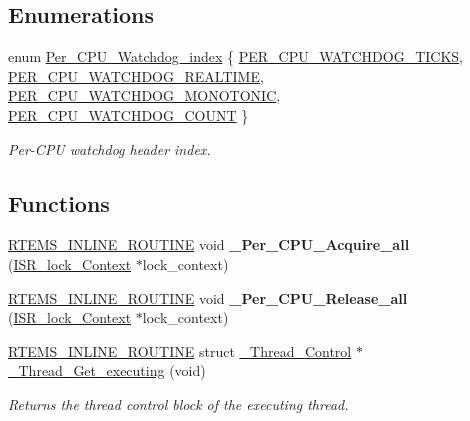 \subsection*{Enumerations}
\begin{DoxyCompactItemize}
\item 
enum \mbox{\hyperlink{group__PerCPU_ga43ab5440a69211901b58fa787f9cd76e}{Per\+\_\+\+C\+P\+U\+\_\+\+Watchdog\+\_\+index}} \{ \mbox{\hyperlink{group__PerCPU_gga43ab5440a69211901b58fa787f9cd76ea5c304d1cc31623c14e84892aec184fc0}{P\+E\+R\+\_\+\+C\+P\+U\+\_\+\+W\+A\+T\+C\+H\+D\+O\+G\+\_\+\+T\+I\+C\+KS}}, 
\mbox{\hyperlink{group__PerCPU_gga43ab5440a69211901b58fa787f9cd76ea4e0da8bba174c18170d5ef3a7a892b75}{P\+E\+R\+\_\+\+C\+P\+U\+\_\+\+W\+A\+T\+C\+H\+D\+O\+G\+\_\+\+R\+E\+A\+L\+T\+I\+ME}}, 
\mbox{\hyperlink{group__PerCPU_gga43ab5440a69211901b58fa787f9cd76ea35f3d6d7579387ed24aaf6b8ebfc64a5}{P\+E\+R\+\_\+\+C\+P\+U\+\_\+\+W\+A\+T\+C\+H\+D\+O\+G\+\_\+\+M\+O\+N\+O\+T\+O\+N\+IC}}, 
\mbox{\hyperlink{group__PerCPU_gga43ab5440a69211901b58fa787f9cd76ea49ebdf20f41288627c23ddc6e63a20ab}{P\+E\+R\+\_\+\+C\+P\+U\+\_\+\+W\+A\+T\+C\+H\+D\+O\+G\+\_\+\+C\+O\+U\+NT}}
 \}
\begin{DoxyCompactList}\small\item\em Per-\/\+C\+PU watchdog header index. \end{DoxyCompactList}\end{DoxyCompactItemize}
\subsection*{Functions}
\begin{DoxyCompactItemize}
\item 
\mbox{\label{group__PerCPU_ga9f5a37354c7461fdffd3693bba17c94e}} 
\mbox{\hyperlink{group__RTEMSScoreBaseDefs_gac216239df231d5dbd15e3520b0b9313f}{R\+T\+E\+M\+S\+\_\+\+I\+N\+L\+I\+N\+E\+\_\+\+R\+O\+U\+T\+I\+NE}} void {\bfseries \+\_\+\+Per\+\_\+\+C\+P\+U\+\_\+\+Acquire\+\_\+all} (\mbox{\hyperlink{structISR__lock__Context}{I\+S\+R\+\_\+lock\+\_\+\+Context}} $\ast$lock\+\_\+context)
\item 
\mbox{\label{group__PerCPU_gad9b0b0999b5d73437b2067289f120089}} 
\mbox{\hyperlink{group__RTEMSScoreBaseDefs_gac216239df231d5dbd15e3520b0b9313f}{R\+T\+E\+M\+S\+\_\+\+I\+N\+L\+I\+N\+E\+\_\+\+R\+O\+U\+T\+I\+NE}} void {\bfseries \+\_\+\+Per\+\_\+\+C\+P\+U\+\_\+\+Release\+\_\+all} (\mbox{\hyperlink{structISR__lock__Context}{I\+S\+R\+\_\+lock\+\_\+\+Context}} $\ast$lock\+\_\+context)
\item 
\mbox{\hyperlink{group__RTEMSScoreBaseDefs_gac216239df231d5dbd15e3520b0b9313f}{R\+T\+E\+M\+S\+\_\+\+I\+N\+L\+I\+N\+E\+\_\+\+R\+O\+U\+T\+I\+NE}} struct \mbox{\hyperlink{struct__Thread__Control}{\+\_\+\+Thread\+\_\+\+Control}} $\ast$ \mbox{\hyperlink{group__PerCPU_ga294cfaf3cf50de03f1d9821d68b9c1bd}{\+\_\+\+Thread\+\_\+\+Get\+\_\+executing}} (void)
\begin{DoxyCompactList}\small\item\em Returns the thread control block of the executing thread. \end{DoxyCompactList}\end{DoxyCompactItemize}
